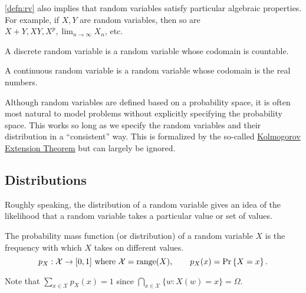 \cref{defn:rv} also implies that random variables satisfy particular algebraic properties.
For example, if $X,Y$ are random variables, then so are $X+Y, XY, X^p, \lim_{n\to\infty}X_n$, etc.
\begin{definition}
  A discrete random variable is a random variable whose codomain is countable.
  \label{defn:drv}
\end{definition}
\begin{definition}
  A continuous random variable is a random variable whose codomain is the real numbers.
  \label{defn:crv}
\end{definition}
Although random variables are defined based on a probability space, it is often most natural to model problems without explicitly specifying the probability space.
This works so long as we specify the random variables and their distribution in a ``consistent'' way. 
This is formalized by the so-called \href{https://en.wikipedia.org/wiki/Kolmogorov_extension_theorem}{Kolmogorov Extension Theorem} but can largely be ignored.
\subsection{Distributions}
Roughly speaking, the distribution of a random variable gives an idea of the likelihood that a random variable takes a particular value or set of values.
\begin{definition}
  The probability mass function (or distribution) of a random variable $X$ is the frequency with which $X$ takes on different values.
  \[
	p_X:\mathcal{X} \rightarrow [0, 1] \text{ where } \mathcal{X} = \text{range}(X),\qquad p_X(x) = \text{Pr}\left\{X=x\right\}.
  \]
  \label{defn:pmf}
\end{definition}
Note that $\sum_{x\in\mathcal{X}}p_X(x) = 1$ since $\bigcap_{x\in\mathcal{X}}\{w: X(w) = x\} = \Omega$.

